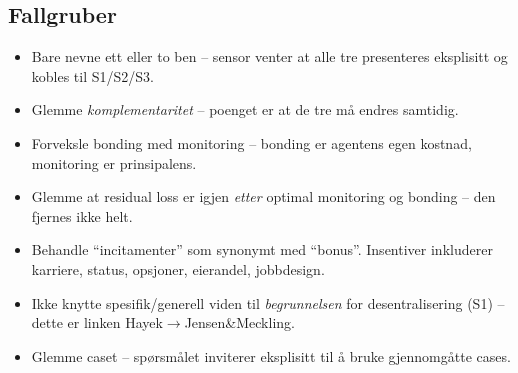 \subsection*{Fallgruber}
\begin{itemize}\setlength{\itemsep}{2pt}
\item Bare nevne ett eller to ben -- sensor venter at alle tre presenteres eksplisitt og kobles til S1/S2/S3.
\item Glemme \emph{komplementaritet} -- poenget er at de tre må endres samtidig.
\item Forveksle bonding med monitoring -- bonding er agentens egen kostnad, monitoring er prinsipalens.
\item Glemme at residual loss er igjen \emph{etter} optimal monitoring og bonding -- den fjernes ikke helt.
\item Behandle ``incitamenter'' som synonymt med ``bonus''. Insentiver inkluderer karriere, status, opsjoner, eierandel, jobbdesign.
\item Ikke knytte spesifik/generell viden til \emph{begrunnelsen} for desentralisering (S1) -- dette er linken Hayek$\to$Jensen\&Meckling.
\item Glemme caset -- spørsmålet inviterer eksplisitt til å bruke gjennomgåtte cases.
\end{itemize}

\FloatBarrier
